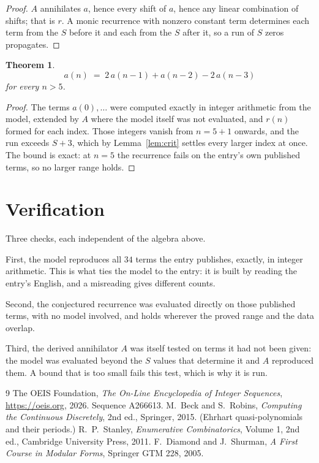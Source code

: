 \documentclass[11pt,a4paper]{article}
\theoremstyle{plain}
\newtheorem{theorem}{Theorem}
\theoremstyle{definition}
\begin{document}
\begin{proof}
$A$ annihilates $a$, hence every shift of $a$, hence any linear combination of shifts; that is
$r$. A monic recurrence with nonzero constant term determines each term from the $S$ before it
and each from the $S$ after it, so a run of $S$ zeros propagates.
\end{proof}

\begin{theorem}
\[
a(n)\;=\;2\,a(n-1) + a(n-2) - 2\,a(n-3)
\]
for every $n>5$.
\end{theorem}

\begin{proof}
The terms $a(0),\dots$ were computed exactly in integer arithmetic from the model, extended by
$A$ where the model itself was not evaluated, and $r(n)$ formed for each index. Those integers
vanish from $n=5+1$ onwards, and the run exceeds $S+3$, which by
Lemma~\ref{lem:crit} settles every larger index at once. The bound is exact: at $n=5$ the recurrence fails on the entry's own published terms, so no larger range holds.
\end{proof}

\section{Verification}

Three checks, each independent of the algebra above.

First, the model reproduces all $34$ terms the entry publishes, exactly, in integer
arithmetic. This is what ties the model to the entry: it is built by reading the entry's
English, and a misreading gives different counts.

Second, the conjectured recurrence was evaluated directly on those published terms, with no
model involved, and holds wherever the proved range and the data overlap.

Third, the derived annihilator $A$ was itself tested on terms it had not been given: the model
was evaluated beyond the $S$ values that determine it and $A$ reproduced them. A bound that is
too small fails this test, which is why it is run.

\begin{thebibliography}{9}
 The OEIS Foundation, \emph{The On-Line Encyclopedia of Integer
Sequences}, \url{https://oeis.org}, 2026. Sequence A266613.
 M.~Beck and S.~Robins, \emph{Computing the Continuous Discretely},
2nd ed., Springer, 2015. (Ehrhart quasi-polynomials and their periods.)
 R.~P.~Stanley, \emph{Enumerative Combinatorics}, Volume 1, 2nd ed.,
Cambridge University Press, 2011.
 F.~Diamond and J.~Shurman, \emph{A First Course in Modular Forms},
Springer GTM 228, 2005.
\end{thebibliography}
\end{document}
